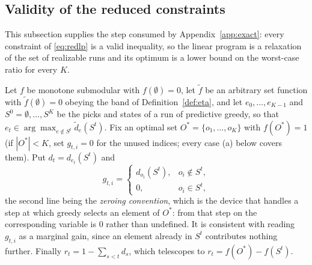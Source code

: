 \subsection{Validity of the reduced constraints}\label{app:validity}

This subsection supplies the step consumed by Appendix~\ref{app:exact}: every
constraint of \eqref{eq:redlp} is a valid inequality, so the linear program is
a relaxation of the set of realizable runs and its optimum is a lower bound on
the worst-case ratio for every $K$.

Let $f$ be monotone submodular with $f(\emptyset)=0$, let $\tilde f$ be an
arbitrary set function with $\tilde f(\emptyset)=0$ obeying the band of
Definition~\ref{def:eta}, and let $e_0,\dots,e_{K-1}$ and
$S^{0}=\emptyset,\dots,S^{K}$ be the picks and states of a run of predictive
greedy, so that $e_t\in\arg\max_{e\notin S^{t}}\tilde d_e(S^{t})$.  Fix an
optimal set $O^{\ast}=\{o_1,\dots,o_K\}$ with $f(O^{\ast})=1$ (if
$|O^{\ast}|<K$, set $g_{t,i}=0$ for the unused indices; every case (a) below
covers them).  Put $d_t=d_{e_t}(S^{t})$ and
\[
  g_{t,i}=\begin{cases} d_{o_i}(S^{t}), & o_i\notin S^{t},\\
                        0, & o_i\in S^{t}, \end{cases}
\]
the second line being the \emph{zeroing convention}, which is the device that
handles a step at which greedy selects an element of $O^{\ast}$: from that step
on the corresponding variable is $0$ rather than undefined.  It is consistent
with reading $g_{t,i}$ as a marginal gain, since an element already in $S^{t}$
contributes nothing further.  Finally $r_t=1-\sum_{s<t}d_s$, which telescopes
to $r_t=f(O^{\ast})-f(S^{t})$.

